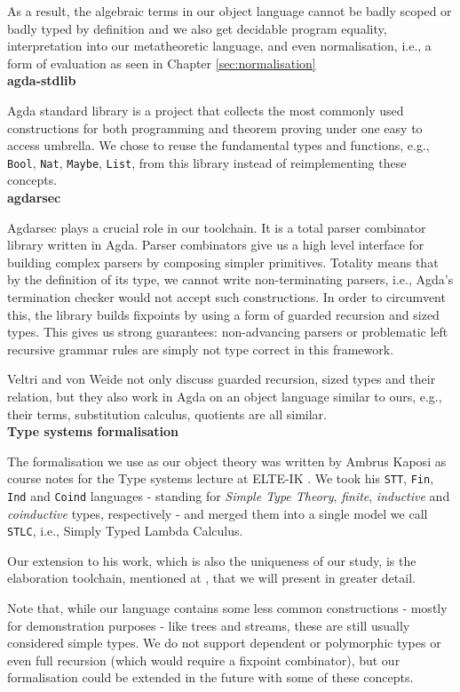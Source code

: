 As a result, the algebraic terms in our object language cannot be badly scoped or badly typed by definition and we also get decidable program equality, interpretation into our metatheoretic language, and even normalisation, i.e., a form of evaluation as seen in Chapter \ref{sec:normalisation}\\

\noindent\textbf{agda-stdlib}

Agda standard library \cite{The_Agda_Community_Agda_Standard_Library_2023} is a project that collects the most commonly used constructions for both programming and theorem proving under one easy to access umbrella. We chose to reuse the fundamental types and functions, e.g., \verb$Bool$, \verb$Nat$, \verb$Maybe$, \verb$List$, from this library instead of reimplementing these concepts.\\

\noindent\textbf{agdarsec}

Agdarsec \cite{allais2018agdarsec} plays a crucial role in our toolchain. It is a total parser combinator library written in Agda. Parser combinators give us a high level interface for building complex parsers by composing simpler primitives. Totality means that by the definition of its type, we cannot write non-terminating parsers, i.e., Agda's termination checker would not accept such constructions. In order to circumvent this, the library builds fixpoints by using a form of guarded recursion and sized types. This gives us strong guarantees: non-advancing parsers or problematic left recursive grammar rules are simply not type correct in this framework.

Veltri and von Weide \cite{veltri2019guarded} not only discuss guarded recursion, sized types and their relation, but they also work in Agda on an object language similar to ours, e.g., their terms, substitution calculus, quotients are all similar.\\

\noindent\textbf{Type systems formalisation}

The formalisation we use as our object theory was written by Ambrus Kaposi as course notes for the Type systems lecture at ELTE-IK \cite{typesystems-repo}. We took his \verb$STT$, \verb$Fin$, \verb$Ind$ and \verb$Coind$ languages - standing for \textit{Simple Type Theory}, \textit{finite}, \textit{inductive} and \textit{coinductive} types, respectively - and merged them into a single model we call \verb$STLC$, i.e., Simply Typed Lambda Calculus.

Our extension to his work, which is also the uniqueness of our study, is the elaboration toolchain, mentioned at \cite{godelTalk}, that we will present in greater detail.

Note that, while our language contains some less common constructions - mostly for demonstration purposes - like trees and streams, these are still usually considered simple types. We do not support dependent or polymorphic types or even full recursion (which would require a fixpoint combinator), but our formalisation could be extended in the future with some of these concepts.

